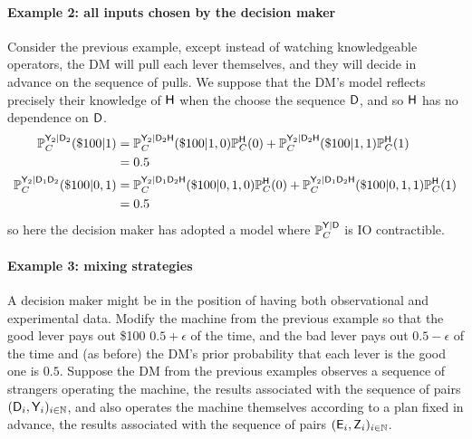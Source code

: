 \paragraph{Example 2: all inputs chosen by the decision maker}

Consider the previous example, except instead of watching knowledgeable operators, the DM will pull each lever themselves, and they will decide in advance on the sequence of pulls. We suppose that the DM's model reflects precisely their knowledge of $\mathsf{H}$ when the choose the sequence $\mathsf{D}$, and so $\mathsf{H}$ has no dependence on $\mathsf{D}$.
\begin{align}
        \mathbb{P}_C^{\mathsf{Y}_2|\mathsf{D}_2}(\$100|1) &= \mathbb{P}_C^{\mathsf{Y}_2|\mathsf{D}_2\mathsf{H}}(\$100|1,0)\mathbb{P}_C^{\mathsf{H}}(0) + \mathbb{P}_C^{\mathsf{Y}_2|\mathsf{D}_2\mathsf{H}}(\$100|1,1)\mathbb{P}_C^{\mathsf{H}}(1)\\
        &= 0.5\\
        \mathbb{P}_C^{\mathsf{Y}_2|\mathsf{D}_1\mathsf{D}_2}(\$100|0,1) &= \mathbb{P}_C^{\mathsf{Y}_2|\mathsf{D}_1\mathsf{D}_2\mathsf{H}}(\$100|0,1,0)\mathbb{P}_C^{\mathsf{H}}(0) + \mathbb{P}_C^{\mathsf{Y}_2|\mathsf{D}_1\mathsf{D}_2\mathsf{H}}(\$100|0,1,1)\mathbb{P}_C^{\mathsf{H}}(1)\\
        &= 0.5
\end{align}
so here the decision maker has adopted a model where $\mathbb{P}_C^{\mathsf{Y}|\mathsf{D}}$ is IO contractible.

\paragraph{Example 3: mixing strategies}\label{pgph:two_kinds}

A decision maker might be in the position of having both observational and experimental data. Modify the machine from the previous example so that the good lever pays out \$100 $0.5+\epsilon$ of the time, and the bad lever pays out $0.5-\epsilon$ of the time and (as before) the DM's prior probability that each lever is the good one is $0.5$. Suppose the DM from the previous examples observes a sequence of strangers operating the machine, the results associated with the sequence of pairs $(\mathsf{D}_i,\mathsf{Y}_i)_{i\in\mathbb{N}}$, and also operates the machine themselves according to a plan fixed in advance, the results associated with the sequence of pairs $(\mathsf{E}_i,\mathsf{Z}_i)_{i\in \mathbb{N}}$. 

